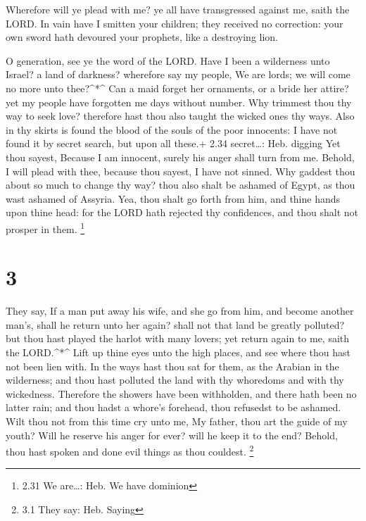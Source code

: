  Wherefore will ye plead with me? ye all have transgressed
against me, saith the LORD.  In vain have I smitten your
children; they received no correction: your own sword hath devoured your
prophets, like a destroying lion.

 O generation, see ye the word of the LORD. Have I been a
wilderness unto Israel? a land of darkness? wherefore say my people, We
are lords; we will come no more unto thee?\^{}*\^{}  Can a
maid forget her ornaments, or a bride her attire? yet my people have
forgotten me days without number.  Why trimmest thou thy
way to seek love? therefore hast thou also taught the wicked ones thy
ways.  Also in thy skirts is found the blood of the souls
of the poor innocents: I have not found it by secret search, but upon
all these.+ 2.34 secret\ldots: Heb. digging  Yet thou
sayest, Because I am innocent, surely his anger shall turn from me.
Behold, I will plead with thee, because thou sayest, I have not sinned.
 Why gaddest thou about so much to change thy way? thou
also shalt be ashamed of Egypt, as thou wast ashamed of Assyria.
 Yea, thou shalt go forth from him, and thine hands upon
thine head: for the LORD hath rejected thy confidences, and thou shalt
not prosper in them. \footnote{2.31 We are\ldots: Heb. We have dominion}

\hypertarget{section-2}{%
\section{3}\label{section-2}}

 They say, If a man put away his wife, and she go from him,
and become another man's, shall he return unto her again? shall not that
land be greatly polluted? but thou hast played the harlot with many
lovers; yet return again to me, saith the LORD.\^{}*\^{} 
Lift up thine eyes unto the high places, and see where thou hast not
been lien with. In the ways hast thou sat for them, as the Arabian in
the wilderness; and thou hast polluted the land with thy whoredoms and
with thy wickedness.  Therefore the showers have been
withholden, and there hath been no latter rain; and thou hadst a whore's
forehead, thou refusedst to be ashamed.  Wilt thou not from
this time cry unto me, My father, thou art the guide of my youth?
 Will he reserve his anger for ever? will he keep it to the
end? Behold, thou hast spoken and done evil things as thou couldest.
\footnote{3.1 They say: Heb. Saying}


